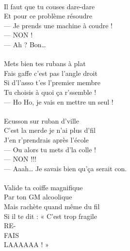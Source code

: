 \\Il faut que tu couses dare-dare
\\Et pour ce problème résoudre
\\— Je prends une machine à coudre !
\\— NON !
\\— Ah ? Bon…
\\\\Mets bien tes rubans à plat
\\Fais gaffe c’est pas l’angle droit
\\Si d’l’asso t’es l’premier membre
\\Tu choisis à quoi ça r’ssemble !
\\— Ho Ho, je vais en mettre un seul !
\\\\Ecusson sur ruban d’ville
\\C’est la merde je n’ai plus d’fil
\\J’en r’prendrais après l’école
\\— Ou alors tu mets d’la colle !
\\— NON !!!
\\— Aaah… Je savais bien qu’ça serait con.
\\\\Valide ta coiffe magnifique
\\Par ton GM alcoolique
\\Mais rachète quand même du fil
\\Si il te dit : « C'est trop fragile
\\RE-
\\FAIS
\\LAAAAAA ! » 

\breakpage